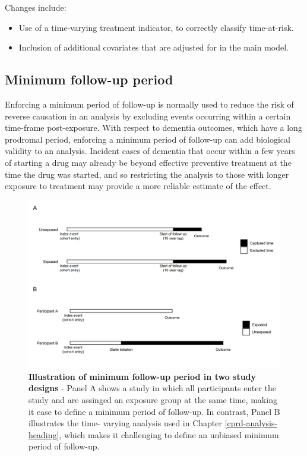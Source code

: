 \documentclass[a4paper, twoside]{templates/ociamthesis}
\providecommand{\tightlist}{%
  \setlength{\itemsep}{0pt}\setlength{\parskip}{0pt}}
\begin{document}
Changes include:

\begin{itemize}
\tightlist
\item
  Use of a time-varying treatment indicator, to correctly classify time-at-risk.
\item
  Inclusion of additional covariates that are adjusted for in the main model.
\end{itemize}

\hypertarget{cprd-min-fu}{%
\subsection{Minimum follow-up period}\label{cprd-min-fu}}

Enforcing a minimum period of follow-up is normally used to reduce the risk of reverse causation in an analysis by excluding events occurring within a certain time-frame post-exposure. With respect to dementia outcomes, which have a long prodromal period, enforcing a minimum period of follow-up can add biological validity to an analysis. Incident cases of dementia that occur within a few years of starting a drug may already be beyond effective preventive treatment at the time the drug was started, and so restricting the analysis to those with longer exposure to treatment may provide a more reliable estimate of the effect.





\begin{figure}[H]
\includegraphics[width=1\linewidth]{figures/appendix/minFU} \caption[Illustration of minimum follow-up period in two study designs]{\textbf{Illustration of minimum follow-up period in two study designs} - Panel A shows a study in which all participants enter the study and are assinged an exposure group at the same time, making it ease to define a minimum period of follow-up. In contrast, Panel B illustrates the time- varying analysis used in Chapter \ref{cprd-analysis-heading}, which makes it challenging to define an unbiased minimum period of follow-up.}\label{fig:minFU}
\end{figure}
\end{document}
